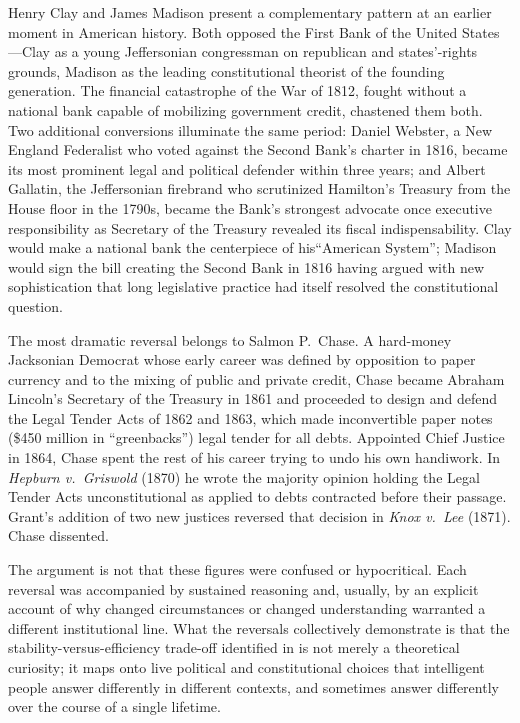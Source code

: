 \documentclass[12pt]{article}
\begin{document}
Henry Clay and James Madison present a complementary pattern at an
earlier moment in American history.  Both opposed the First Bank of the
United States---Clay as a young Jeffersonian congressman on republican
and states'-rights grounds, Madison as the leading constitutional
theorist of the founding generation.  The financial catastrophe of the
War of 1812, fought without a national bank capable of mobilizing
government credit, chastened them both.  Two additional conversions
illuminate the same period: Daniel Webster, a New England Federalist who
voted against the Second Bank's charter in 1816, became its most
prominent legal and political defender within three years; and Albert
Gallatin, the Jeffersonian firebrand who scrutinized Hamilton's Treasury
from the House floor in the 1790s, became the Bank's strongest advocate
once executive responsibility as Secretary of the Treasury revealed its
fiscal indispensability.  Clay would make a national bank
the centerpiece of his``American System''; Madison would sign the bill
creating the Second Bank in 1816 having argued with new sophistication
that long legislative practice had itself resolved the constitutional
question.

The most dramatic reversal belongs to Salmon P.\ Chase.  A
hard-money Jacksonian Democrat whose early career was defined by
opposition to paper currency and to the mixing of public and private
credit, Chase became Abraham Lincoln's Secretary of the Treasury in 1861
and proceeded to design and defend the Legal Tender Acts of 1862 and
1863, which made inconvertible paper notes (\$450 million in
``greenbacks'') legal tender for all debts.  Appointed Chief Justice
in 1864, Chase spent the rest of his career trying to undo his own
handiwork.  In \textit{Hepburn v.\ Griswold} (1870) he wrote the
majority opinion holding the Legal Tender Acts unconstitutional as
applied to debts contracted before their passage.  Grant's addition of
two new justices reversed that decision in \textit{Knox v.\ Lee} (1871).
Chase dissented.

The argument is not that these figures were confused or hypocritical.
Each reversal was accompanied by sustained reasoning and, usually, by
an explicit account of why changed circumstances or changed understanding
warranted a different institutional line.  What the reversals collectively
demonstrate is that the stability-versus-efficiency trade-off identified
in \citet{Sargent2011} is not merely a theoretical curiosity; it maps
onto live political and constitutional choices that intelligent people
answer differently in different contexts, and sometimes answer differently
over the course of a single lifetime.
\end{document}
